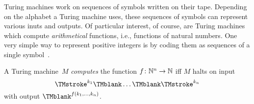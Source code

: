 \documentclass[open-logic-section]{subfiles}
\begin{document}

\begin{wordy}
Turing machines work on sequences of symbols written on their tape.
Depending on the alphabet a Turing machine uses, these sequences of
symbols can represent various inuts and outputs.  Of particular
interest, of course, are Turing machines which compute
\emph{arithmetical} functions, i.e., functions of natural numbers.
One very simple way to represent positive integers is by coding them
as sequences of a single symbol~\TMstroke.
\end{wordy}

\begin{defn}
A Turing machine~$M$ \emph{computes} the function $f\colon \mathbb{N}^n \to \mathbb{N}$ iff
$M$ halts on input
\[
\TMstroke^{k_1} \TMblank \dots \TMblank \TMstroke^{k_n}
\]
with output $\TMblank^{f(k_1, \dots, k_n)}$.
\end{defn}

\end{document}
